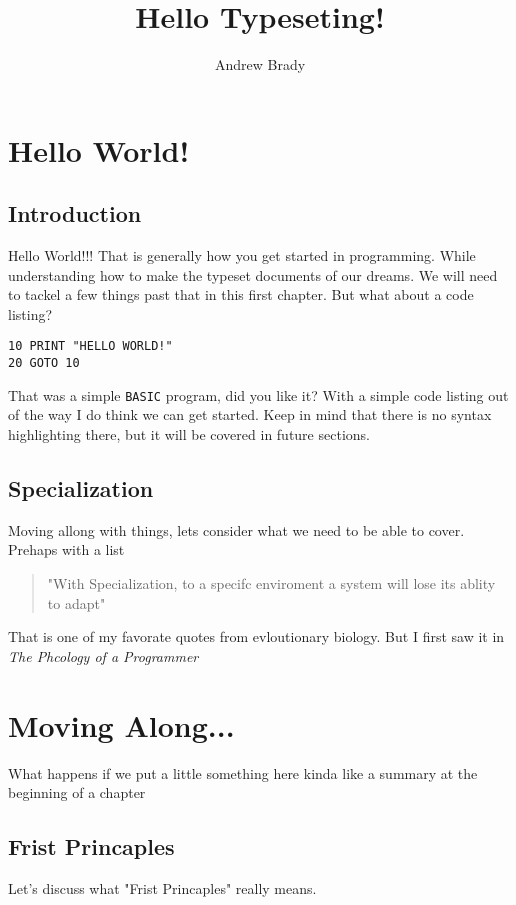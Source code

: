 \documentclass[12pt,A5]{book}
\author{Andrew Brady}
\title{Hello Typeseting!}
\begin{document}
\maketitle
\tableofcontents

\chapter{Hello World!}

\section{Introduction}
Hello World!!! That is generally how you get started in programming. While understanding how to make the typeset documents of our dreams. We will need to tackel a few things past that in this first chapter. \newline But what about a code listing?

\begin{verbatim}
10 PRINT "HELLO WORLD!"
20 GOTO 10
\end{verbatim}

That was a simple \verb|BASIC| program, did you like it? With a simple code listing out of the way I do think we can get started. Keep in mind that there is no syntax highlighting there, but it will be covered in future sections.

\section{Specialization}
Moving allong with things, lets consider what we need to be able to cover. Prehaps with a list
\begin{quote}
"With Specialization, to a specifc enviroment a system will lose its ablity to adapt"
\end{quote}
That is one of my favorate quotes from evloutionary biology. But I first saw it in \textit{The Phcology of a Programmer}

\chapter{Moving Along...}

What happens if we put a little something here kinda like a summary at the beginning of a chapter

\section{Frist Princaples}

Let's discuss what "Frist Princaples" really means.
\end{document}
